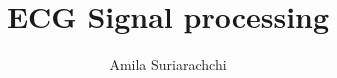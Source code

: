 \documentclass{article}
\title{ECG Signal processing}
\author{Amila Suriarachchi}
\date{}
\begin{document}
\begin{titlepage}
\clearpage\maketitle
\thispagestyle{empty}
\end{titlepage}






\end{document}
